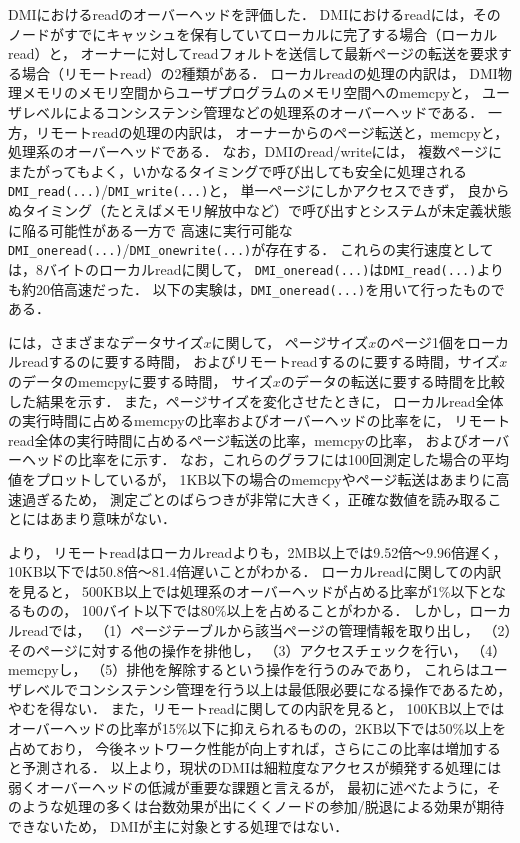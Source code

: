\documentclass[10pt]{jsarticle}
\begin{document}
DMIにおけるreadのオーバーヘッドを評価した．
DMIにおけるreadには，そのノードがすでにキャッシュを保有していてローカルに完了する場合（ローカルread）と，
オーナーに対してreadフォルトを送信して最新ページの転送を要求する場合（リモートread）の2種類がある．
ローカルreadの処理の内訳は，
DMI物理メモリのメモリ空間からユーザプログラムのメモリ空間へのmemcpyと，
ユーザレベルによるコンシステンシ管理などの処理系のオーバーヘッドである．
一方，リモートreadの処理の内訳は，
オーナーからのページ転送と，memcpyと，処理系のオーバーヘッドである．
なお，DMIのread/writeには，
複数ページにまたがってもよく，いかなるタイミングで呼び出しても安全に処理される
\texttt{DMI\_read(...)}/\texttt{DMI\_write(...)}と，
単一ページにしかアクセスできず，
良からぬタイミング（たとえばメモリ解放中など）で呼び出すとシステムが未定義状態に陥る可能性がある一方で
高速に実行可能な\texttt{DMI\_oneread(...)}/\texttt{DMI\_onewrite(...)}が存在する．
これらの実行速度としては，8バイトのローカルreadに関して，
\texttt{DMI\_oneread(...)}は\texttt{DMI\_read(...)}よりも約20倍高速だった．
以下の実験は，\texttt{DMI\_oneread(...)}を用いて行ったものである．

には，さまざまなデータサイズ$x$に関して，
ページサイズ$x$のページ1個をローカルreadするのに要する時間，
およびリモートreadするのに要する時間，サイズ$x$のデータのmemcpyに要する時間，
サイズ$x$のデータの転送に要する時間を比較した結果を示す．
また，ページサイズを変化させたときに，
ローカルread全体の実行時間に占めるmemcpyの比率およびオーバーヘッドの比率をに，
リモートread全体の実行時間に占めるページ転送の比率，memcpyの比率，
およびオーバーヘッドの比率をに示す．
なお，これらのグラフには100回測定した場合の平均値をプロットしているが，
1KB以下の場合のmemcpyやページ転送はあまりに高速過ぎるため，
測定ごとのばらつきが非常に大きく，正確な数値を読み取ることにはあまり意味がない．

より，
リモートreadはローカルreadよりも，2MB以上では9.52倍〜9.96倍遅く，
10KB以下では50.8倍〜81.4倍遅いことがわかる．
ローカルreadに関しての内訳を見ると，
500KB以上では処理系のオーバーヘッドが占める比率が1\%以下となるものの，
100バイト以下では80\%以上を占めることがわかる．
しかし，ローカルreadでは，
（1）ページテーブルから該当ページの管理情報を取り出し，
（2）そのページに対する他の操作を排他し，
（3）アクセスチェックを行い，
（4）memcpyし，
（5）排他を解除するという操作を行うのみであり，
これらはユーザレベルでコンシステンシ管理を行う以上は最低限必要になる操作であるため，やむを得ない．
また，リモートreadに関しての内訳を見ると，
100KB以上ではオーバーヘッドの比率が15\%以下に抑えられるものの，2KB以下では50\%以上を占めており，
今後ネットワーク性能が向上すれば，さらにこの比率は増加すると予測される．
以上より，現状のDMIは細粒度なアクセスが頻発する処理には弱くオーバーヘッドの低減が重要な課題と言えるが，
最初に述べたように，そのような処理の多くは台数効果が出にくくノードの参加/脱退による効果が期待できないため，
DMIが主に対象とする処理ではない．
\end{document}
